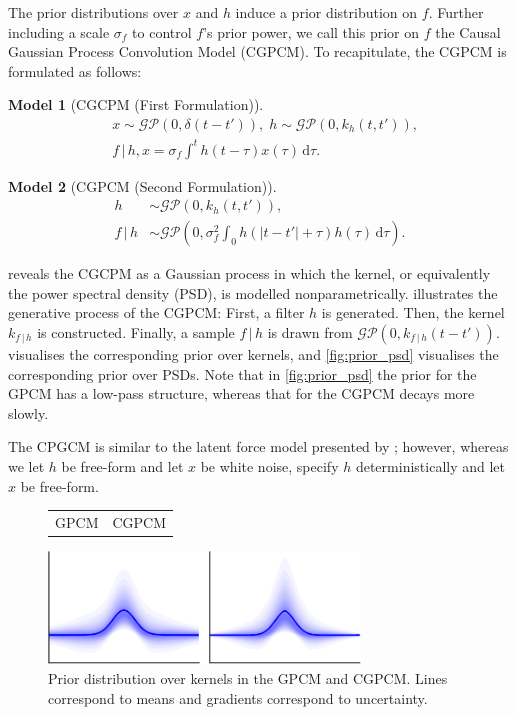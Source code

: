 \documentclass{article}
\newcommand{\id}[1]{\, \mathrm{d} #1}     %
\newcommand{\cond}{\, | \,}               %
\newtheorem{model}{Model}
\begin{document}
The prior distributions over $x$ and $h$ induce a prior distribution on $f$. Further including a scale $\sigma_f$ to control $f$'s prior power, we call this prior on $f$ the Causal Gaussian Process Convolution Model (CGPCM). To recapitulate, the CGPCM is formulated as follows:

\begin{model}[CGCPM (First Formulation)] \label{mod:cgpcm}
    \begin{align*}
        &x \sim \mathcal{GP}(0,\delta(t-t')), \;
        h \sim \mathcal{GP}(0, k_h(t,t')), \\
        &f\cond h, x = \sigma_f \int^t h(t- \tau)x(\tau)\id{\tau}.
    \end{align*}
\end{model}
\begin{model}[CGPCM (Second Formulation)] \label{mod:cgpcm2}
    \begin{align*}
        h &\sim \mathcal{GP}(0, k_h(t,t')), \\
        f \cond h &\sim \mathcal{GP}\left(0,  \sigma_f^2\int_0 h(|t-t'|+\tau)h(\tau)\id{\tau} \right).
    \end{align*}
\end{model}

 reveals the CGCPM as a Gaussian process in which the kernel, or equivalently the power spectral density (PSD), is modelled nonparametrically.  illustrates the generative process of the CGPCM: First, a filter $h$ is generated. Then, the kernel $k_{f\cond h}$ is constructed. Finally, a sample $f\cond h$ is drawn from $\mathcal{GP}(0,k_{f \cond h}(t-t'))$.  visualises the corresponding prior over kernels, and \cref{fig:prior_psd} visualises the corresponding prior over PSDs. Note that in \cref{fig:prior_psd} the prior for the GPCM has a low-pass structure, whereas that for the CGPCM decays more slowly.

The CPGCM is similar to the latent force model presented by \citet{Alvarez:2009:Latent_Force_Models}; however, whereas we let $h$ be free-form and let $x$ be white noise, \citet{Alvarez:2009:Latent_Force_Models} specify $h$ deterministically and let $x$ be free-form.

\begin{figure}[t]
    \centering
    \begin{tabularx}{\linewidth}{>{\centering}X>{\centering}X}
        GPCM & CGPCM
    \end{tabularx}
    \includegraphics[width=\linewidth, height=3cm]{resources/cropped/prior.pdf}
    \caption{Prior distribution over kernels in the GPCM and CGPCM. Lines correspond to means and gradients correspond to uncertainty.}
    \label{fig:prior}
\end{figure}
\end{document}
